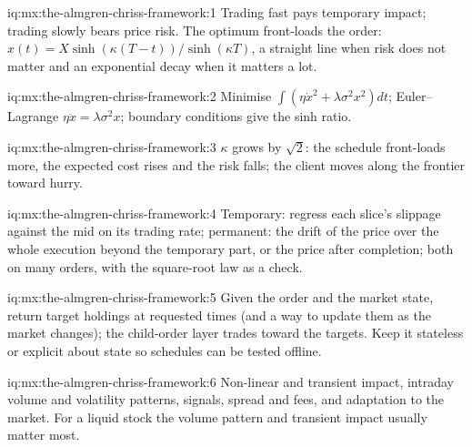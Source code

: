 \begin{solution}{iq:mx:the-almgren-chriss-framework:1}
Trading fast pays temporary impact; trading slowly bears price risk. The optimum front-loads the order: $x(t)=X\sinh(\kappa(T-t))/\sinh(\kappa T)$, a
straight line when risk does not matter and an exponential decay when it matters a lot.
\end{solution}

\begin{solution}{iq:mx:the-almgren-chriss-framework:2}
Minimise $\int(\eta\dot x^2+\lambda\sigma^2x^2)dt$; Euler--Lagrange $\eta\ddot x=\lambda\sigma^2x$; boundary conditions give the sinh ratio.
\end{solution}

\begin{solution}{iq:mx:the-almgren-chriss-framework:3}
$\kappa$ grows by $\sqrt2$: the schedule front-loads more, the expected cost rises and the risk falls; the client moves along the frontier toward hurry.
\end{solution}

\begin{solution}{iq:mx:the-almgren-chriss-framework:4}
Temporary: regress each slice's slippage against the mid on its trading rate; permanent: the drift of the price over the whole execution beyond the
temporary part, or the price after completion; both on many orders, with the square-root law as a check.
\end{solution}

\begin{solution}{iq:mx:the-almgren-chriss-framework:5}
Given the order and the market state, return target holdings at requested times (and a way to update them as the market changes); the child-order
layer trades toward the targets. Keep it stateless or explicit about state so schedules can be tested offline.
\end{solution}

\begin{solution}{iq:mx:the-almgren-chriss-framework:6}
Non-linear and transient impact, intraday volume and volatility patterns, signals, spread and fees, and adaptation to the market. For a liquid stock the
volume pattern and transient impact usually matter most.
\end{solution}
